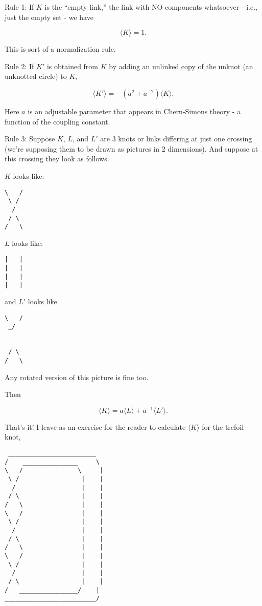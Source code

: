 \documentclass{article}
\begin{document}
Rule 1: If \(K\) is the ``empty link,'' the link with NO components
whatsoever - i.e., just the empty set - we have

\[\langle K \rangle = 1.\]

This is sort of a normalization rule.

Rule 2: If \(K'\) is obtained from \(K\) by adding an unlinked copy of
the unknot (an unknotted circle) to \(K\),

\[\langle K' \rangle = -(a^2 + a^{-2})\langle K \rangle.\]

Here \(a\) is an adjustable parameter that appears in Chern-Simons
theory - a function of the coupling constant.

Rule 3: Suppose \(K\), \(L\), and \(L'\) are 3 knots or links differing
at just one crossing (we're supposing them to be drawn as pictures in 2
dimensions). And suppose at this crossing they look as follows.

\(K\) looks like:

\begin{verbatim}
\   /
 \ /
  /
 / \
/   \
\end{verbatim}

\(L\) looks like:

\begin{verbatim}
|   |
|   |
|   |
|   |
\end{verbatim}

and \(L'\) looks like

\begin{verbatim}
\   /
 _/

  _
 / \
/   \
\end{verbatim}

Any rotated version of this picture is fine too.

Then

\[\langle K \rangle = a\langle L\rangle + a^{-1}\langle L'\rangle.\]

That's it! I leave as an exercise for the reader to calculate
\(\langle K \rangle\) for the trefoil knot,

\begin{verbatim}
 ________________________
/    _______________     \ 
\   /               \     |
 \ /                 |    |
  /                  |    |    
 / \                 |    |
/   \                |    |
\   /                |    |
 \ /                 |    |
  /                  |    |    
 / \                 |    |
/   \                |    |
\   /                |    |
 \ /                 |    |
  /                  |    |    
 / \                 |    |
/   ________________/    |
_________________________/
\end{verbatim}
\end{document}
